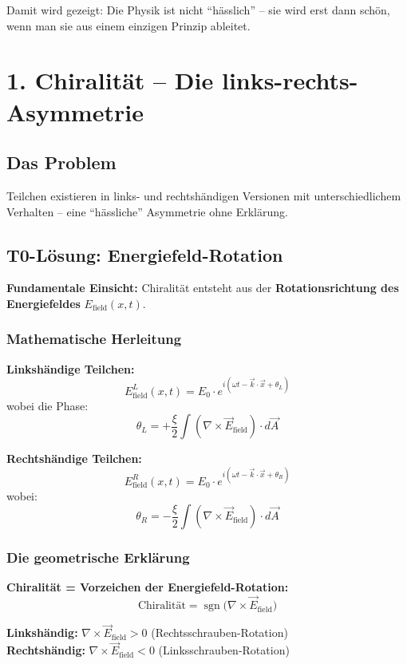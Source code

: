 		Damit wird gezeigt: Die Physik ist nicht ``hässlich'' – sie wird erst dann schön, wenn man sie aus einem einzigen Prinzip ableitet.


	
	\section*{1. Chiralität – Die links-rechts-Asymmetrie}
	
	\subsection*{Das Problem}
	Teilchen existieren in links- und rechtshändigen Versionen mit unterschiedlichem Verhalten – eine ``hässliche'' Asymmetrie ohne Erklärung.
	
	\subsection*{T0-Lösung: Energiefeld-Rotation}
	
	\textbf{Fundamentale Einsicht:} Chiralität entsteht aus der \textbf{Rotationsrichtung des Energiefeldes} $E_{\text{field}}(x,t)$.
	
	\subsubsection*{Mathematische Herleitung}
	
	\textbf{Linkshändige Teilchen:}
	\[
	E_{\text{field}}^L(x,t) = E_0 \cdot e^{i(\omega t - \vec{k} \cdot \vec{x} + \theta_L)}
	\]
	wobei die Phase:
	\[
	\theta_L = +\frac{\xi}{2} \int (\nabla \times \vec{E}_{\text{field}}) \cdot d\vec{A}
	\]
	
	\textbf{Rechtshändige Teilchen:}
	\[
	E_{\text{field}}^R(x,t) = E_0 \cdot e^{i(\omega t - \vec{k} \cdot \vec{x} + \theta_R)}
	\]
	wobei:
	\[
	\theta_R = -\frac{\xi}{2} \int (\nabla \times \vec{E}_{\text{field}}) \cdot d\vec{A}
	\]
	
	\subsubsection*{Die geometrische Erklärung}
	
	\textbf{Chiralität = Vorzeichen der Energiefeld-Rotation:}
	\[
	\boxed{\text{Chiralität} = \operatorname{sgn}\bigl(\nabla \times \vec{E}_{\text{field}}\bigr)}
	\]
	
	\textbf{Linkshändig:} $\nabla \times \vec{E}_{\text{field}} > 0$ (Rechtsschrauben-Rotation) \\
	\textbf{Rechtshändig:} $\nabla \times \vec{E}_{\text{field}} < 0$ (Linksschrauben-Rotation)
	

